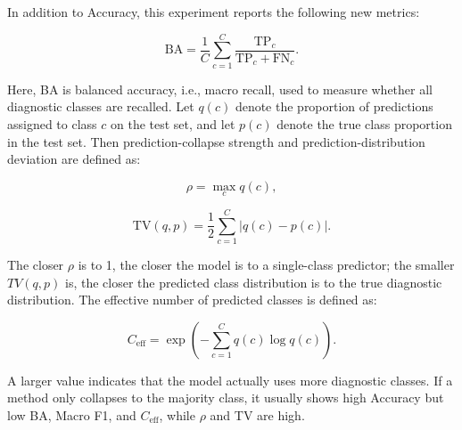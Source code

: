 \documentclass[letterpaper]{article}
\begin{document}
In addition to Accuracy, this experiment reports the following new metrics:


\begin{equation}
\mathrm{BA}=\frac{1}{C}\sum_{c=1}^{C}
\frac{\mathrm{TP}_c}{\mathrm{TP}_c+\mathrm{FN}_c}.
\end{equation}

Here, BA is balanced accuracy, i.e., macro recall, used to measure whether all diagnostic classes are recalled. Let $q(c)$ denote the proportion of predictions assigned to class $c$ on the test set, and let $p(c)$ denote the true class proportion in the test set. Then prediction-collapse strength and prediction-distribution deviation are defined as:

\begin{equation}
\rho=\max_c q(c),
\end{equation}

\begin{equation}
\mathrm{TV}(q,p)=\frac{1}{2}\sum_{c=1}^{C}|q(c)-p(c)|.
\end{equation}

The closer $\rho$ is to 1, the closer the model is to a single-class predictor; the smaller $TV(q,p)$ is, the closer the predicted class distribution is to the true diagnostic distribution. The effective number of predicted classes is defined as:


\begin{equation}
C_{\mathrm{eff}}=\exp\left(-\sum_{c=1}^{C}q(c)\log q(c)\right).
\end{equation}

A larger value indicates that the model actually uses more diagnostic classes. If a method only collapses to the majority class, it usually shows high Accuracy but low BA, Macro F1, and $C_{\mathrm{eff}}$, while $\rho$ and TV are high.
\end{document}
